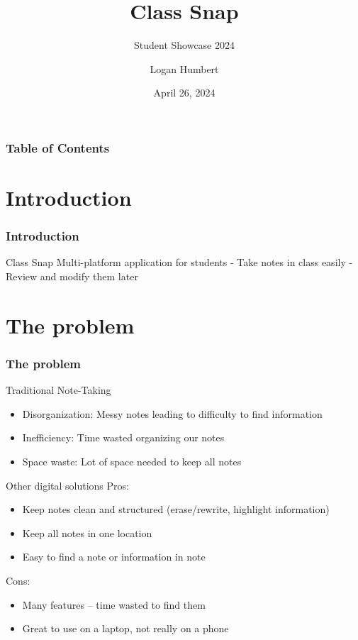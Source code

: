 \documentclass{beamer}
\title{Class Snap}
\subtitle{Student Showcase 2024}
\author{Logan Humbert}
\institute{Colorado Mesa University}
\date{April 26, 2024}
\begin{document}
	\frame{\titlepage}
	
	\begin{frame}
		\frametitle{Table of Contents}
		\tableofcontents
	\end{frame}
	
	\section{Introduction}
	\begin{frame}
		\frametitle{Introduction}
		
		\begin{alertblock}{Class Snap}
			Multi-platform application for students
			\linebreak
			- Take notes in class easily
			\linebreak
			- Review and modify them later
		\end{alertblock}
	\end{frame}
	
	\section{The problem}
	\begin{frame}
		\frametitle{The problem}
		
		\begin{alertblock}{Traditional Note-Taking}
			\begin{itemize}
				\item Disorganization: Messy notes leading to difficulty to find information
				\item Inefficiency: Time wasted organizing our notes
				\item Space waste: Lot of space needed to keep all notes
			\end{itemize}
		\end{alertblock}
		
		\begin{alertblock}{Other digital solutions}
			Pros:
			\begin{itemize}
				\item  Keep notes clean and structured (erase/rewrite, highlight information)
				\item Keep all notes in one location
				\item Easy to find a note or information in note
			\end{itemize}
			
			Cons:
			\begin{itemize}
				\item Many features -- time wasted to find them
				\item Great to use on a laptop, not really on a phone
			\end{itemize}
		\end{alertblock}
	\end{frame}
	
\end{document}
